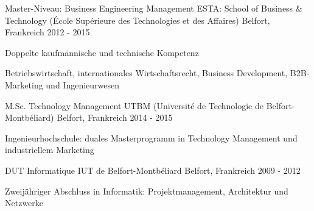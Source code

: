 

\begin{cventries}
  \cventry
{Master-Niveau: Business Engineering Management} %
{ESTA: School of Business \& Technology (École Supérieure des Technologies et des Affaires)} %
{Belfort, Frankreich} %
{2012 - 2015} %
{
	\begin{cvitems} %
		\item {Doppelte kaufmännische und technische Kompetenz}
		\item {Betriebswirtschaft, internationales Wirtschaftsrecht, Business Development, B2B-Marketing und Ingenieurwesen}
	\end{cvitems}
}

  \cventry
    {M.Sc. Technology Management} %
    {UTBM (Université de Technologie de Belfort-Montbéliard)} %
    {Belfort, Frankreich} %
    {2014 - 2015} %
    {
      \begin{cvitems} %
        \item {Ingenieurhochschule: duales Masterprogramm in Technology Management und industriellem Marketing}
      \end{cvitems}
    }
    


  \cventry
    {DUT Informatique} %
    {IUT de Belfort-Montbéliard} %
    {Belfort, Frankreich} %
    {2009 - 2012} %
    {
      \begin{cvitems} %
        \item {Zweijähriger Abschluss in Informatik: Projektmanagement, Architektur und Netzwerke}
      \end{cvitems}
    }


\end{cventries}
